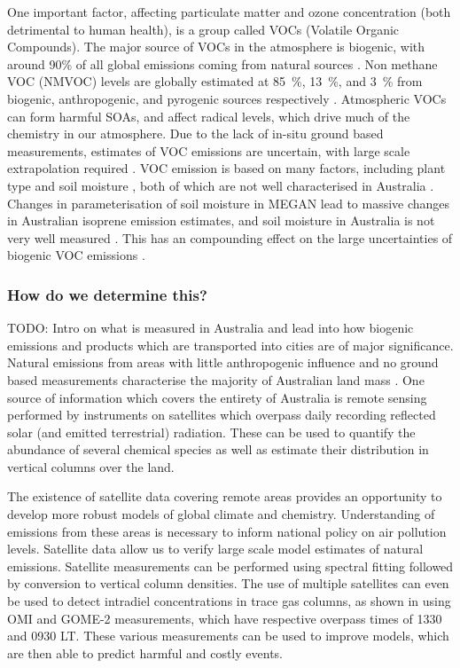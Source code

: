     One important factor, affecting particulate matter and ozone concentration (both detrimental to human health), is a group called VOCs (Volatile Organic Compounds).
    The major source of VOCs in the atmosphere is biogenic, with around 90\% of all global emissions coming from natural sources \citep{Guenther1995,Guenther2006, Millet2006}.
    Non methane VOC (NMVOC) levels are globally estimated at 85~\%, 13~\%, and 3~\% from biogenic, anthropogenic, and pyrogenic sources respectively \citep{Kefauver2014}.  
    Atmospheric VOCs can form harmful SOAs, and affect radical levels, which drive much of the chemistry in our atmosphere.
    Due to the lack of in-situ ground based measurements, estimates of VOC emissions are uncertain, with large scale extrapolation required \citet{Millet2006}.
    VOC emission is based on many factors, including plant type and soil moisture \citep{Guenther1995}, both of which are not well characterised in Australia \citep{Sindelarova2014, Bauwens2016}.
    Changes in parameterisation of soil moisture in MEGAN lead to massive changes in Australian isoprene emission estimates, and soil moisture in Australia is not very well measured \citep{Sindelarova2014}.
    This has an compounding effect on the large uncertainties of biogenic VOC emissions \citep{Guenther2000, Millet2006}.
    
    \subsubsection{How do we determine this?}
    
      TODO: Intro on what is measured in Australia and lead into how biogenic emissions and products which are transported into cities are of major significance.
      Natural emissions from areas with little anthropogenic influence and no ground based measurements characterise the majority of Australian land mass \citep{VanDerA2008}.
      One source of information which covers the entirety of Australia is remote sensing performed by instruments on satellites which overpass daily recording reflected solar (and emitted terrestrial) radiation.
      These can be used to quantify the abundance of several chemical species as well as estimate their distribution in vertical columns over the land.
      
      The existence of satellite data covering remote areas provides an opportunity to develop more robust models of global climate and chemistry.
      Understanding of emissions from these areas is necessary to inform national policy on air pollution levels.
      Satellite data allow us to verify large scale model estimates of natural emissions.
      Satellite measurements can be performed using spectral fitting followed by conversion to vertical column densities.
      The use of multiple satellites can even be used to detect intradiel concentrations in trace gas columns, as shown in \cite{Stavrakou2015} using OMI and GOME-2 measurements, which have respective overpass times of 1330 and 0930 LT.
      These various measurements can be used to improve models, which are then able to predict harmful and costly events.
      
